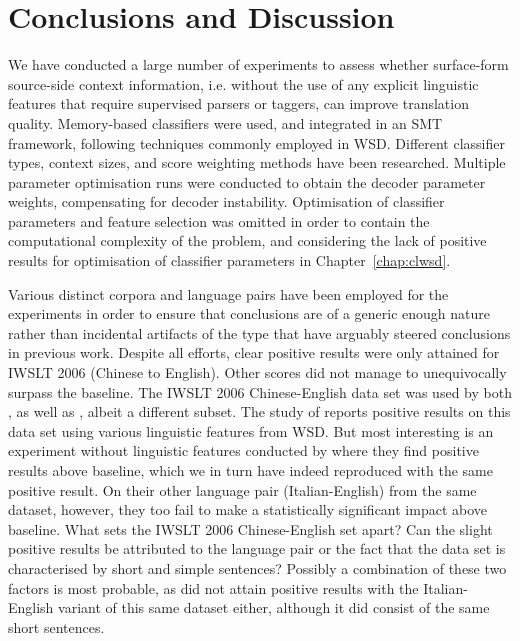 \section{Conclusions and Discussion}
\label{sec:conclusion}

We have conducted a large number of experiments to assess whether surface-form
source-side context information, i.e. without the use of any explicit
linguistic features that require supervised parsers or taggers, can improve
translation quality. Memory-based classifiers were used, and integrated in an
SMT framework, following techniques commonly employed in WSD. Different
classifier types, context sizes, and score weighting methods have been
researched. Multiple parameter optimisation runs were conducted to obtain the
decoder parameter weights, compensating for decoder instability. Optimisation
of classifier parameters and feature selection was omitted in order to contain
the computational complexity of the problem, and considering the lack of positive
results for optimisation of classifier parameters in Chapter~\ref{chap:clwsd}.

Various distinct corpora and language pairs have been employed for the
experiments in order to ensure that conclusions are of a generic enough nature
rather than incidental artifacts of the type that have arguably steered
conclusions in previous work. Despite all efforts, clear positive results were
only attained for IWSLT 2006 (Chinese to English). Other scores did not manage
to unequivocally surpass the baseline. The IWSLT 2006 Chinese-English data set
was used by both \cite{CarpuatWu07}, as well as \cite{Stroppa+07}, albeit a
different subset. The study of \cite{CarpuatWu07} reports positive results on
this data set using various linguistic features from WSD. But most interesting
is an experiment without linguistic features conducted by \cite{Stroppa+07}
where they find positive results above baseline, which we in turn have indeed
reproduced with the same positive result. On their other language pair
(Italian-English) from the same dataset, however, they too fail to make a
statistically significant impact above baseline. What sets the IWSLT 2006
Chinese-English set apart? Can the slight positive results be attributed to the
language pair or the fact that the data set is characterised by short and
simple sentences? Possibly a combination of these two factors is most probable,
as \cite{Stroppa+07} did not attain positive results with the Italian-English
variant of this same dataset either, although it did consist of the same short
sentences.

